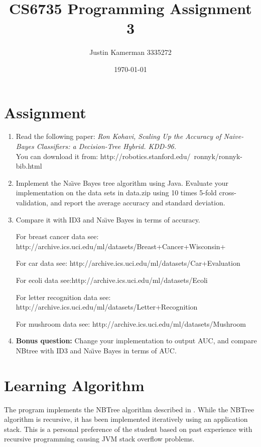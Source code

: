 \documentclass[10pt]{report}
\title{CS6735 Programming Assignment 3}
\author{Justin Kamerman 3335272}
\date{\today}
\begin{document}
\maketitle
\renewcommand*\thesection{\arabic{section}}

\section{Assignment}
\begin{enumerate} 
\item Read the following paper: 
\textit{Ron Kohavi, Scaling Up the Accuracy of Naive-Bayes Classifiers: a
Decision-Tree Hybrid. KDD-96.}
\\
You can download it from: 
http://robotics.stanford.edu/~ronnyk/ronnyk-bib.html
\item Implement the Na\"{\i}ve Bayes tree algorithm using Java. Evaluate
your implementation on the data sets in data.zip using 10 times 5-fold
cross-validation, and report the average accuracy and standard
deviation.  
\item Compare it with ID3 and Na\"{\i}ve Bayes in terms of accuracy. 

For breast cancer data see:
http://archive.ics.uci.edu/ml/datasets/Breast+Cancer+Wisconsin+%

For car data see:
http://archive.ics.uci.edu/ml/datasets/Car+Evaluation

For ecoli data see:http://archive.ics.uci.edu/ml/datasets/Ecoli

For letter recognition data see:
http://archive.ics.uci.edu/ml/datasets/Letter+Recognition

For mushroom data see: http://archive.ics.uci.edu/ml/datasets/Mushroom

\item \textbf{Bonus question:} Change your implementation to output AUC, and
  compare NBtree with ID3 and Na\"{\i}ve Bayes in terms of AUC. 
\end{enumerate}

\section{Learning Algorithm}
\label{sec:learningalgorithm}
The program implements the NBTree algorithm
described in \cite{RefWorks:63}. While the NBTree algorithm is
recursive, it has been implemented iteratively using an application
stack. This is a personal preference of the student based on past
experience with recursive programming causing JVM stack overflow
problems.
\end{document}
